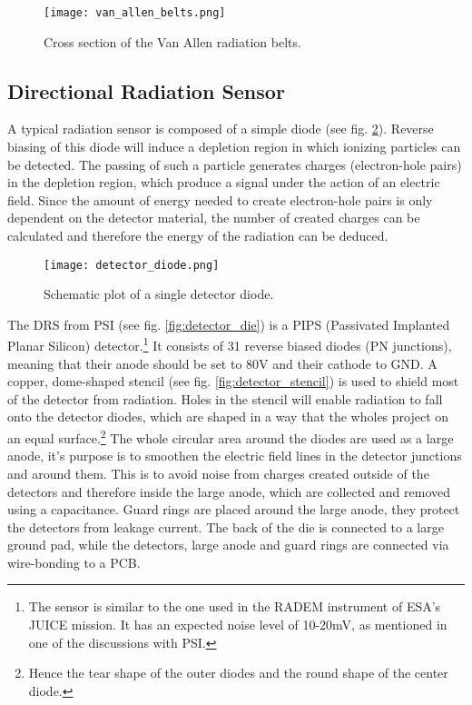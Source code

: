 \begin{figure}[H]
    \centering
    \texttt{[image: van\_allen\_belts.png]}
    \caption[Van Allen Radiation Belts]{Cross section of the Van Allen radiation belts.\cite{wikipedia2016vanallen}}
    \label{fig:van_allen_belts}
\end{figure}


\subsection{Directional Radiation Sensor}
\label{sec:radiation_sensor}
A typical radiation sensor is composed of a simple diode (see fig. \ref{fig:detector_diode}).
Reverse biasing of this diode will induce a depletion region in which ionizing particles can be detected.
The passing of such a particle generates charges (electron-hole pairs) in the depletion region, which produce a signal under the action of an electric field.
Since the amount of energy needed to create electron-hole pairs is only dependent on the detector material, the number of created charges can be calculated and therefore the energy of the radiation can be deduced.\cite{rossi2006pixel}

\begin{figure}[H]
    \centering
    \texttt{[image: detector\_diode.png]}
    \caption[Schematic Detector Diode]{Schematic plot of a single detector diode.\cite{am2016semiconductor}}
    \label{fig:detector_diode}
\end{figure}

The DRS from PSI (see fig. \ref{fig:detector_die}) is a PIPS (Passivated Implanted Planar Silicon) detector.\footnote{The sensor is similar to the one used in the RADEM instrument of ESA's JUICE mission. It has an expected noise level of 10-20mV, as mentioned in one of the discussions with PSI.}
It consists of 31 reverse biased diodes (PN junctions), meaning that their anode should be set to 80V and their cathode to GND.
A copper, dome-shaped stencil (see fig. \ref{fig:detector_stencil}) is used to shield most of the detector from radiation.
Holes in the stencil will enable radiation to fall onto the detector diodes, which are shaped in a way that the wholes project on an equal surface.\footnote{Hence the tear shape of the outer diodes and the round shape of the center diode.}
The whole circular area around the diodes are used as a large anode, it's purpose is to smoothen the electric field lines in the detector junctions and around them.
This is to avoid noise from charges created outside of the detectors and therefore inside the large anode, which are collected and removed using a capacitance.
Guard rings are placed around the large anode, they protect the detectors from leakage current.
The back of the die is connected to a large ground pad, while the detectors, large anode and guard rings are connected via wire-bonding to a PCB.

